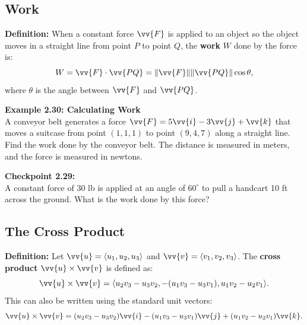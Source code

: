 \documentclass{article}
\begin{document}
\subsection*{Work}

\begin{definitionbox}
    \textbf{Definition:} When a constant force \(\vv{F}\) is applied to an object so the object moves in a straight line from point \(P\) to point \(Q\), the \textbf{work} \(W\) done by the force is:
    \[
    W = \vv{F} \cdot \vv{PQ} = \|\vv{F}\| \|\vv{PQ}\| \cos \theta,
    \]
    where \(\theta\) is the angle between \(\vv{F}\) and \(\vv{PQ}\).
\end{definitionbox}

\begin{examplebox}
    \textbf{Example 2.30: Calculating Work} \\
    A conveyor belt generates a force \(\vv{F} = 5\vv{i} - 3\vv{j} + \vv{k}\) that moves a suitcase from point \((1, 1, 1)\) to point \((9, 4, 7)\) along a straight line. Find the work done by the conveyor belt. The distance is measured in meters, and the force is measured in newtons.
\end{examplebox}

\begin{exercisebox}
    \textbf{Checkpoint 2.29:} \\
    A constant force of 30 lb is applied at an angle of \(60^\circ\) to pull a handcart 10 ft across the ground. What is the work done by this force?
\end{exercisebox}

\subsection*{The Cross Product}

\begin{definitionbox}
    \textbf{Definition:} Let \(\vv{u} = \langle u_1, u_2, u_3 \rangle\) and \(\vv{v} = \langle v_1, v_2, v_3 \rangle\). The \textbf{cross product} \(\vv{u} \times \vv{v}\) is defined as:
    \[
    \vv{u} \times \vv{v} = \langle u_2 v_3 - u_3 v_2, -(u_1 v_3 - u_3 v_1), u_1 v_2 - u_2 v_1 \rangle.
    \]
    This can also be written using the standard unit vectors:
    \[
    \vv{u} \times \vv{v} = (u_2 v_3 - u_3 v_2) \vv{i} - (u_1 v_3 - u_3 v_1) \vv{j} + (u_1 v_2 - u_2 v_1) \vv{k}.
    \]
\end{definitionbox}
\end{document}
